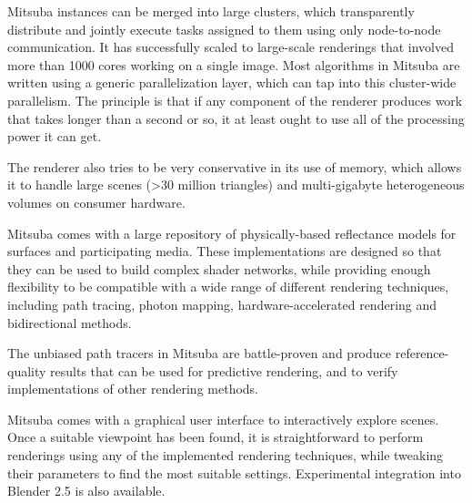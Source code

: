  Mitsuba instances can be merged into large clusters, which transparently distribute and
jointly execute tasks assigned to them using only node-to-node communication. It has successfully
scaled to large-scale renderings that involved more than 1000 cores working on a single image.
Most algorithms in Mitsuba  are written using a generic parallelization layer, which can tap
into this cluster-wide parallelism. The principle is that if any component of the renderer produces
work that takes longer than a second or so, it at least ought to use all of the processing power
it can get.

The renderer also tries to be very conservative in its use of memory, which allows it to handle
large scenes (>30 million triangles) and multi-gigabyte heterogeneous volumes on consumer hardware.

 Mitsuba comes with a large repository of physically-based
reflectance models for surfaces and participating media. These implementations
are designed so that they can be used to build complex shader networks, while
providing enough flexibility to be compatible with a wide range of different
rendering techniques, including path tracing, photon mapping, hardware-accelerated rendering
and bidirectional methods.

The unbiased path tracers in Mitsuba are battle-proven and produce
reference-quality results that can be used for predictive rendering, and to verify
implementations of other rendering methods.

Mitsuba comes with a graphical user interface to interactively explore scenes. Once a suitable
viewpoint has been found, it is straightforward to perform renderings using any of the
implemented rendering techniques, while tweaking their parameters to find the most suitable
settings. Experimental integration into Blender 2.5 is also available.

